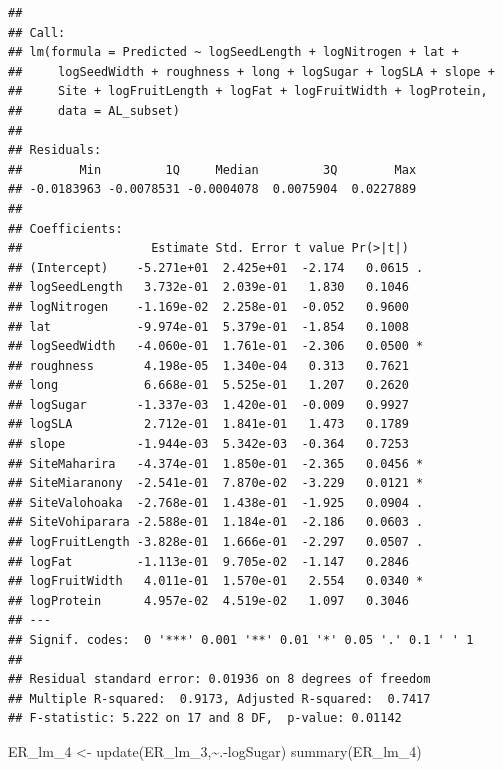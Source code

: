 \documentclass[
  12pt,
]{article}
\newenvironment{Shaded}{\begin{snugshade}}{\end{snugshade}}
\newcommand{\FunctionTok}[1]{\textcolor[rgb]{0.00,0.00,0.00}{#1}}
\newcommand{\NormalTok}[1]{#1}
\newcommand{\OtherTok}[1]{\textcolor[rgb]{0.56,0.35,0.01}{#1}}
\newcommand{\SpecialCharTok}[1]{\textcolor[rgb]{0.00,0.00,0.00}{#1}}
\begin{document}
\begin{verbatim}
## 
## Call:
## lm(formula = Predicted ~ logSeedLength + logNitrogen + lat + 
##     logSeedWidth + roughness + long + logSugar + logSLA + slope + 
##     Site + logFruitLength + logFat + logFruitWidth + logProtein, 
##     data = AL_subset)
## 
## Residuals:
##        Min         1Q     Median         3Q        Max 
## -0.0183963 -0.0078531 -0.0004078  0.0075904  0.0227889 
## 
## Coefficients:
##                  Estimate Std. Error t value Pr(>|t|)  
## (Intercept)    -5.271e+01  2.425e+01  -2.174   0.0615 .
## logSeedLength   3.732e-01  2.039e-01   1.830   0.1046  
## logNitrogen    -1.169e-02  2.258e-01  -0.052   0.9600  
## lat            -9.974e-01  5.379e-01  -1.854   0.1008  
## logSeedWidth   -4.060e-01  1.761e-01  -2.306   0.0500 *
## roughness       4.198e-05  1.340e-04   0.313   0.7621  
## long            6.668e-01  5.525e-01   1.207   0.2620  
## logSugar       -1.337e-03  1.420e-01  -0.009   0.9927  
## logSLA          2.712e-01  1.841e-01   1.473   0.1789  
## slope          -1.944e-03  5.342e-03  -0.364   0.7253  
## SiteMaharira   -4.374e-01  1.850e-01  -2.365   0.0456 *
## SiteMiaranony  -2.541e-01  7.870e-02  -3.229   0.0121 *
## SiteValohoaka  -2.768e-01  1.438e-01  -1.925   0.0904 .
## SiteVohiparara -2.588e-01  1.184e-01  -2.186   0.0603 .
## logFruitLength -3.828e-01  1.666e-01  -2.297   0.0507 .
## logFat         -1.113e-01  9.705e-02  -1.147   0.2846  
## logFruitWidth   4.011e-01  1.570e-01   2.554   0.0340 *
## logProtein      4.957e-02  4.519e-02   1.097   0.3046  
## ---
## Signif. codes:  0 '***' 0.001 '**' 0.01 '*' 0.05 '.' 0.1 ' ' 1
## 
## Residual standard error: 0.01936 on 8 degrees of freedom
## Multiple R-squared:  0.9173, Adjusted R-squared:  0.7417 
## F-statistic: 5.222 on 17 and 8 DF,  p-value: 0.01142
\end{verbatim}

\begin{Shaded}
\begin{Highlighting}[]
\NormalTok{ER\_lm\_4 }\OtherTok{\textless{}{-}} \FunctionTok{update}\NormalTok{(ER\_lm\_3,}\SpecialCharTok{\textasciitilde{}}\NormalTok{.}\SpecialCharTok{{-}}\NormalTok{logSugar)}
\FunctionTok{summary}\NormalTok{(ER\_lm\_4)}
\end{Highlighting}
\end{Shaded}
\end{document}
